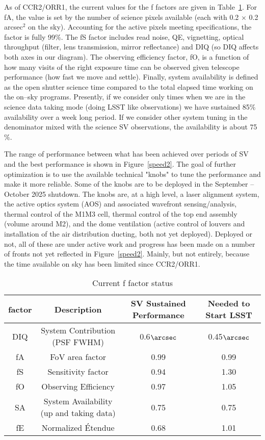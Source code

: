 As of CCR2/ORR1, the current values for the f factors are given in Table~\ref{tab:factors}. For fA, the value is set by the number of science pixels available (each with 0.2 $\times$ 0.2 arcsec$^2$ on the sky). Accounting for the active pixels meeting specifications, the factor is fully 99$\%$. The fS factor includes read noise, QE, vignetting, optical throughput (filter, lens transmission, mirror reflectance) and DIQ (so DIQ affects both axes in our diagram). The observing efficiency factor, fO, is a function of how many visits of the right exposure time can be observed given telescope performance (how fast we move and settle). Finally, system availability is defined as the open shutter science time compared to the total elapsed time working on the on--sky programs. Presently, if we consider only times when we are in the science data taking mode (doing LSST like observations) we have sustained 85$\%$ availability over a week long period. If we consider other system tuning in the denominator mixed with the science SV observations, the availability is about 75$\%$. 

The range of performance between what has been achieved over periods of SV and the best performance is shown in Figure~\ref{speed2}. The goal of further optimization is to use the available technical "knobs" to tune the performance and make it more reliable. Some of the knobs are to be deployed in the September -- October 2025 shutdown. The knobs are, at a high level, a laser alignment system, the active optics system (AOS) and associated wavefront sensing/analysis, thermal control of the M1M3 cell, thermal control of the top end assembly (volume around M2), and the dome ventilation (active control of louvers and installation of the air distribution ducting, both not yet deployed). Deployed or not, all of these are under active work and progress has been made on a number of fronts not yet reflected in Figure~\ref{speed2}. Mainly, but not entirely,  because the time available on sky has been limited since CCR2/ORR1. 

\begin{table}[]
\renewcommand{\arraystretch}{2}
\small
\centering
\caption{Current f factor status}\label{tab:factors}
\begin{tabular}{cccc}
\hline
factor & Description& SV Sustained Performance & Needed to Start LSST \\
\hline \hline
DIQ & System Contribution (PSF FWHM)  & 0.6$\arcsec$ & 0.45$\arcsec$ \\
fA & FoV area factor & 0.99 & 0.99 \\
fS & Sensitivity factor & 0.94 & 1.30 \\
fO & Observing Efficiency & 0.97 & 1.05 \\
SA & System Availability (up and taking data) & 0.75 & 0.75 \\
fE & Normalized \'{E}tendue & 0.68 & 1.01 \\

\hline
\end{tabular}
\end{table}

